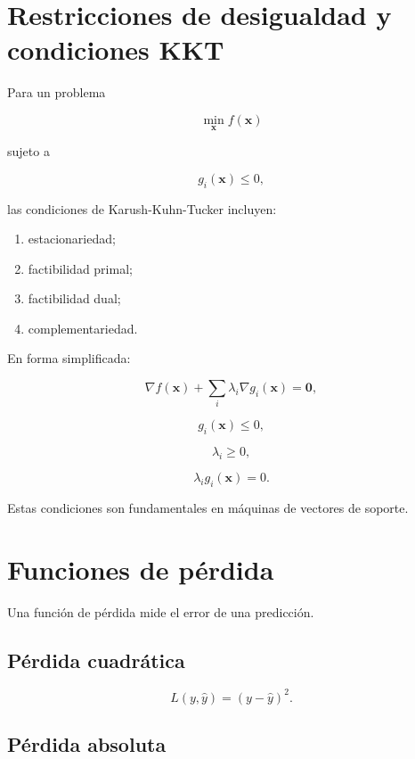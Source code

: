 \documentclass[
  spanish,
  11pt,
  letterpaper,
  DIV=11,
  numbers=noendperiod]{scrreprt}
\providecommand{\tightlist}{%
  \setlength{\itemsep}{0pt}\setlength{\parskip}{0pt}}
\theoremstyle{definition}
\theoremstyle{plain}
\theoremstyle{definition}
\theoremstyle{remark}
\begin{document}
\section{Restricciones de desigualdad y condiciones
KKT}\label{restricciones-de-desigualdad-y-condiciones-kkt}

Para un problema

\[
\min_{\mathbf{x}}
f(\mathbf{x})
\]

sujeto a

\[
g_i(\mathbf{x})\leq 0,
\]

las condiciones de Karush-Kuhn-Tucker incluyen:

\begin{enumerate}
\def\labelenumi{\arabic{enumi}.}
\tightlist
\item
  estacionariedad;
\item
  factibilidad primal;
\item
  factibilidad dual;
\item
  complementariedad.
\end{enumerate}

En forma simplificada:

\[
\nabla f(\mathbf{x})
+
\sum_i
\lambda_i
\nabla g_i(\mathbf{x})
=
\mathbf{0},
\]

\[
g_i(\mathbf{x})\leq 0,
\]

\[
\lambda_i\geq 0,
\]

\[
\lambda_i g_i(\mathbf{x})=0.
\]

Estas condiciones son fundamentales en máquinas de vectores de soporte.

\section{Funciones de pérdida}\label{funciones-de-puxe9rdida}

Una función de pérdida mide el error de una predicción.

\subsection{Pérdida cuadrática}\label{puxe9rdida-cuadruxe1tica}

\[
L(y,\widehat{y})
=
(y-\widehat{y})^2.
\]

\subsection{Pérdida absoluta}\label{puxe9rdida-absoluta}
\end{document}
